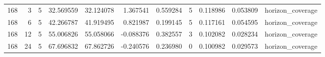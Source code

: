 \begin{table}
\begin{tabular}{rrrrrrrrrrl}
168 & 3 & 5 & 32.569559 & 32.124078 & 1.367541 & 0.559284 & 5 & 0.118986 & 0.053809 & horizon\_coverage \\
168 & 6 & 5 & 42.266787 & 41.919495 & 0.821987 & 0.199145 & 5 & 0.117161 & 0.054595 & horizon\_coverage \\
168 & 12 & 5 & 55.006826 & 55.058066 & -0.088376 & 0.382557 & 3 & 0.102082 & 0.028234 & horizon\_coverage \\
168 & 24 & 5 & 67.696832 & 67.862726 & -0.240576 & 0.236980 & 0 & 0.100982 & 0.029573 & horizon\_coverage \\
\bottomrule
\end{tabular}
\end{table}
